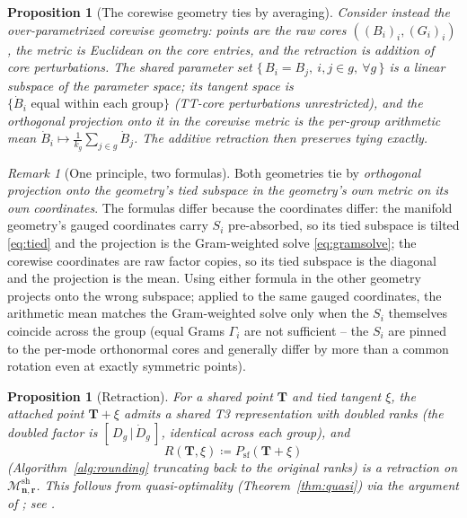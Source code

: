 \documentclass[11pt]{article}
\newtheorem{proposition}[theorem]{Proposition}
\theoremstyle{definition}
\theoremstyle{remark}
\newtheorem{remark}[theorem]{Remark}
\newcommand{\T}{\boldsymbol{T}}
\newcommand{\Msh}{\mathcal{M}^{\mathrm{sh}}_{\boldsymbol{n},\boldsymbol{r}}}
\begin{document}
\begin{proposition}[The corewise geometry ties by averaging]
\label{prop:corewise}
Consider instead the over-parametrized \emph{corewise} geometry: points are
the raw cores $((B_i)_i, (G_i)_i)$, the metric is Euclidean on the core
entries, and the retraction is addition of core perturbations. The shared
parameter set $\{\,B_i = B_j,\ i, j \in g,\ \forall g\,\}$ is a linear
subspace of the parameter space; its tangent space is
$\{\dot B_i \text{ equal within each group}\}$ (TT-core perturbations
unrestricted), and the orthogonal projection onto it in the corewise metric
is the per-group arithmetic mean
$\dot B_i \mapsto \tfrac{1}{k_g} \sum_{j \in g} \dot B_j$. The additive
retraction then preserves tying exactly.
\end{proposition}

\begin{remark}[One principle, two formulas]
Both geometries tie by \emph{orthogonal projection onto the geometry's tied
subspace in the geometry's own metric on its own coordinates}. The formulas
differ because the coordinates differ: the manifold geometry's gauged
coordinates carry $S_i$ pre-absorbed, so its tied subspace is tilted
\eqref{eq:tied} and the projection is the Gram-weighted solve
\eqref{eq:gramsolve}; the corewise coordinates are raw factor copies, so its
tied subspace is the diagonal and the projection is the mean. Using either
formula in the other geometry projects onto the wrong subspace; applied to
the same gauged coordinates, the arithmetic mean matches the Gram-weighted
solve only when the $S_i$ themselves coincide across the group (equal Grams
$\Gamma_i$ are not sufficient -- the $S_i$ are pinned to the per-mode
orthonormal cores and generally differ by more than a common rotation even
at exactly symmetric points).
\end{remark}

\begin{proposition}[Retraction]\label{prop:retract}
For a shared point $\T$ and tied tangent $\xi$, the attached point
$\T + \xi$ admits a shared T3 representation with doubled ranks (the doubled
factor is $[\,D_g \,|\, \dot D_g\,]$, identical across each group), and
\[
R(\T, \xi) \coloneqq P_{\mathrm{sf}}(\T + \xi)
\]
(Algorithm~\ref{alg:rounding} truncating back to the original ranks) is a
retraction on $\Msh$. This follows from quasi-optimality
(Theorem~\ref{thm:quasi}) via the argument of
\cite[Prop.~2.3]{KSV2014}; see \cite[Prop.~6]{MR2026}.
\end{proposition}
\end{document}
